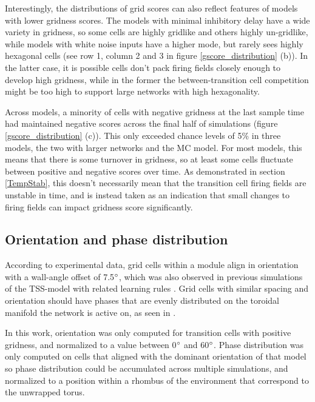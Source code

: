 \documentclass{article}
\begin{document}
    Interestingly, the distributions of grid scores can also reflect features of models with lower gridness scores. The models with minimal inhibitory delay have a wide variety in gridness, so some cells are highly gridlike and others highly un-gridlike, while models with white noise inputs have a higher mode, but rarely sees highly hexagonal cells (see row 1, column 2 and 3 in figure \ref{gscore_distribution} (b)). In the latter case, it is possible cells don't pack firing fields closely enough to develop high gridness, while in the former the between-transition cell competition might be too high to support large networks with high hexagonality.

    Across models, a minority of cells with negative gridness at the last sample time had maintained negative scores across the final half of simulations (figure \ref{gscore_distribution} (c)). This only exceeded chance levels of 5\% in three models, the two with larger networks and the MC model. For most models, this means that there is some turnover in gridness, so at least some cells fluctuate between positive and negative scores over time. As demonstrated in section \ref{TempStab}, this doesn't necessarily mean that the transition cell firing fields are unstable in time, and is instead taken as an indication that small changes to firing fields can impact gridness score significantly. 

    \subsection{Orientation and phase distribution} \label{OrientationPhaseResults}

    According to experimental data, grid cells within a module align in orientation with a wall-angle offset of 7.5\(\degree\), which was also observed in previous simulations of the TSS-model with related learning rules \parencite{Stensola2015, Waniek2017}. Grid cells with similar spacing and orientation should have phases that are evenly distributed on the toroidal manifold the network is active on, as seen in \cite{Gardner2022}. 
    
    In this work, orientation was only computed for transition cells with positive gridness, and normalized to a value between 0\(\degree\) and 60\(\degree\). Phase distribution was only computed on cells that aligned with the dominant orientation of that model so phase distribution could be accumulated across multiple simulations, and normalized to a position within a rhombus of the environment that correspond to the unwrapped torus.
\end{document}
